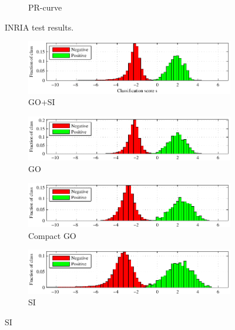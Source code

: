\documentclass[thesis.tex]{subfiles}
\begin{document}
\begin{figure}[tb]
{\begin{subfigure}[t]{0.593\textwidth}
		\caption{PR-curve}
		\label{fig:inriaTestResultsPR}
	\end{subfigure}}
	\caption{INRIA test results.}
	\label{fig:inriaTestResults}
\end{figure}
%
\begin{figure}
	\centering
	\begin{subfigure}[t]{\textwidth}
		\includegraphics[width=\textwidth]{img/inriaHistogramGoSiFinal.pdf}
		\caption{GO+SI}
		\label{fig:inriaHistogramGoSiFinal}
	\end{subfigure}
	\begin{subfigure}[t]{\textwidth}
		\includegraphics[width=\textwidth]{img/inriaHistogramGoFinal.pdf}
		\caption{GO}
		\label{fig:inriaHistogramGoFinal}
	\end{subfigure}
	\begin{subfigure}[t]{\textwidth}
		\includegraphics[width=\textwidth]{img/inriaHistogramGoChosenSmall.pdf}
		\caption{Compact GO}
		\label{fig:inriaHistogramGoChosenSmall}
	\end{subfigure}
	\begin{subfigure}[t]{\textwidth}
		\includegraphics[width=\textwidth]{img/inriaHistogramSiFinal.pdf}
		\caption{SI}
		\label{fig:inriaHistogramSiFinal}

\end{subfigure}
\end{figure}
\end{document}
